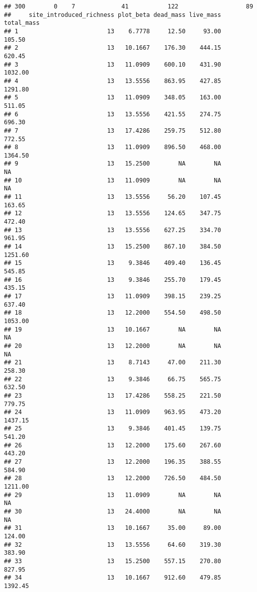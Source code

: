 \documentclass[]{article}
\begin{document}
\begin{verbatim}
## 300        0    7             41           122                   89
##     site_introduced_richness plot_beta dead_mass live_mass total_mass
## 1                         13    6.7778     12.50     93.00     105.50
## 2                         13   10.1667    176.30    444.15     620.45
## 3                         13   11.0909    600.10    431.90    1032.00
## 4                         13   13.5556    863.95    427.85    1291.80
## 5                         13   11.0909    348.05    163.00     511.05
## 6                         13   13.5556    421.55    274.75     696.30
## 7                         13   17.4286    259.75    512.80     772.55
## 8                         13   11.0909    896.50    468.00    1364.50
## 9                         13   15.2500        NA        NA         NA
## 10                        13   11.0909        NA        NA         NA
## 11                        13   13.5556     56.20    107.45     163.65
## 12                        13   13.5556    124.65    347.75     472.40
## 13                        13   13.5556    627.25    334.70     961.95
## 14                        13   15.2500    867.10    384.50    1251.60
## 15                        13    9.3846    409.40    136.45     545.85
## 16                        13    9.3846    255.70    179.45     435.15
## 17                        13   11.0909    398.15    239.25     637.40
## 18                        13   12.2000    554.50    498.50    1053.00
## 19                        13   10.1667        NA        NA         NA
## 20                        13   12.2000        NA        NA         NA
## 21                        13    8.7143     47.00    211.30     258.30
## 22                        13    9.3846     66.75    565.75     632.50
## 23                        13   17.4286    558.25    221.50     779.75
## 24                        13   11.0909    963.95    473.20    1437.15
## 25                        13    9.3846    401.45    139.75     541.20
## 26                        13   12.2000    175.60    267.60     443.20
## 27                        13   12.2000    196.35    388.55     584.90
## 28                        13   12.2000    726.50    484.50    1211.00
## 29                        13   11.0909        NA        NA         NA
## 30                        13   24.4000        NA        NA         NA
## 31                        13   10.1667     35.00     89.00     124.00
## 32                        13   13.5556     64.60    319.30     383.90
## 33                        13   15.2500    557.15    270.80     827.95
## 34                        13   10.1667    912.60    479.85    1392.45

\end{verbatim}
\end{document}
